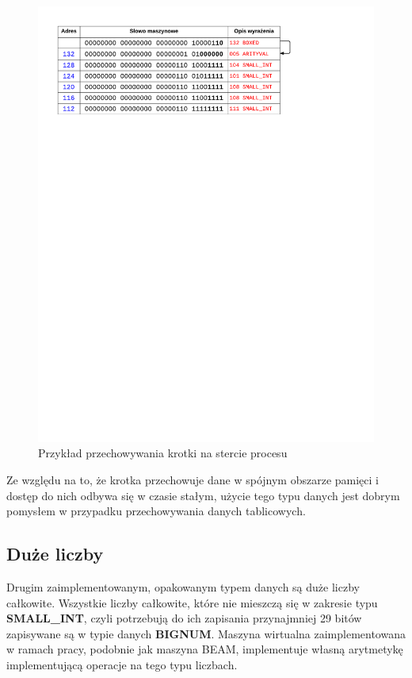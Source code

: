 \begin{figure}[h]
\centerline{\includegraphics[scale=1, clip, trim=0 210mm 45mm 0]{tuple_on_heap}}
\caption{Przykład przechowywania krotki na stercie procesu}
\label{fig:tupleonheap}
\end{figure}

Ze względu na to, że krotka przechowuje dane w spójnym obszarze pamięci i dostęp do nich odbywa się w czasie stałym, użycie tego typu danych jest dobrym pomysłem w przypadku przechowywania danych tablicowych.

\subsection{Duże liczby}
\label{sub:typyBigs}

Drugim zaimplementowanym, opakowanym typem danych są duże liczby całkowite.
Wszystkie liczby całkowite, które nie mieszczą się w zakresie typu \textbf{SMALL\_INT}, czyli potrzebują do ich zapisania przynajmniej 29 bitów zapisywane są w typie danych \textbf{BIGNUM}.
Maszyna wirtualna zaimplementowana w ramach pracy, podobnie jak maszyna BEAM, implementuje własną arytmetykę implementującą operacje na tego typu liczbach.

